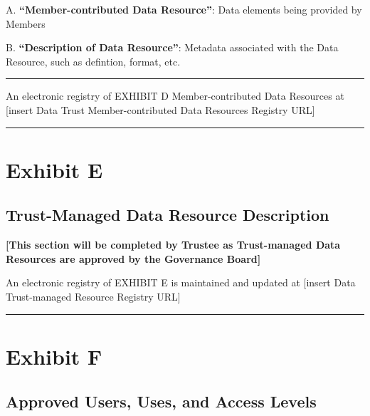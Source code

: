 \documentclass[]{book}
\begin{document}
A. \textbf{``Member-contributed Data Resource''}: Data elements being provided by Members

B. \textbf{``Description of Data Resource''}: Metadata associated with the Data Resource, such as defintion, format, etc.

\begin{center}\rule{0.5\linewidth}{0.5pt}\end{center}

An electronic registry of EXHIBIT D Member-contributed Data Resources at {[}insert Data Trust Member-contributed Data Resources Registry URL{]}

\begin{center}\rule{0.5\linewidth}{0.5pt}\end{center}

\hypertarget{exhibit-e}{%
\chapter*{Exhibit E}\label{exhibit-e}}

\hypertarget{trust-managed-data-resource-description}{%
\section*{Trust-Managed Data Resource Description}\label{trust-managed-data-resource-description}}

\textbf{{[}This section will be completed by Trustee as Trust-managed Data Resources are approved by the Governance Board{]}}

An electronic registry of EXHIBIT E is maintained and updated at {[}insert Data Trust-managed Resource Registry URL{]}

\begin{center}\rule{0.5\linewidth}{0.5pt}\end{center}

\hypertarget{exhibit-f}{%
\chapter*{Exhibit F}\label{exhibit-f}}

\hypertarget{approved-users-uses-and-access-levels}{%
\section*{Approved Users, Uses, and Access Levels}\label{approved-users-uses-and-access-levels}}
\end{document}
